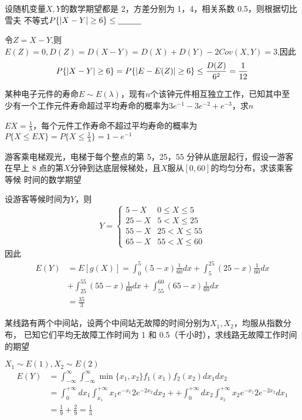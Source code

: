 \documentclass{article}
\begin{document}
\begin{examplle}[]
设随机变量\(X,Y\)的数学期望都是 2，方差分别为 1，4，相关系数 0.5，则根据切比雪夫
不等式\(P\{\abs{X-Y}\ge 6\}\le\und{\hspace{1cm}}\)

令\(Z=X-Y\),则\(E(Z)=0,D(Z)=D(X-Y)=D(X)+D(Y)-2Cov(X,Y)=3\),因此
\begin{equation*}
P\{\abs{X-Y}\ge6\}=P\{\abs{E-E(Z)}\ge6\}\le\frac{D(Z)}{6^2}=\frac{1}{12}
\end{equation*}
\end{examplle}

\begin{examplle}[]
某种电子元件的寿命\(E\sim E(\lambda)\)，现有\(n\)个该钟元件相互独立工作，已知其中至
少有一个工作元件寿命超过平均寿命的概率为\(3e^{-1}-3e^{-2}+e^{-3}\)，求\(n\)

\(EX=\frac{1}{\lambda}\)，每个元件工作寿命不超过平均寿命的概率为
\(P\{X\le EX\}=P\{X\le\frac{1}{\lambda}\}=1-e^{-1}\)
\end{examplle}

\begin{examplle}[]
游客乘电梯观光，电梯于每个整点的第 5，25，55 分钟从底层起行，假设一游客在早上 8
点的第\(X\)分钟到达底层候梯处，且\(X\)服从\([0,60]\)的均匀分布，求该乘客等候
时间的数学期望

设游客等候时间为\(Y\)，则
\begin{equation*}
Y=
\begin{cases}
5-X&0\le X\le 5\\
25-X&5<X\le25\\
55-X&25<X\le 55\\
65-X&55<X\le60
\end{cases}
\end{equation*}
因此
\begin{align*}
E(Y)&=E[g(X)]=\int_0^5(5-x)\frac{1}{60}dx+\int_5^{25}(25-x)\frac{1}{60}dx\\
&+\int_{25}^{55}(55-x)\frac{1}{60}dx+\int_{55}^{60}(65-x)\frac{1}{60}dx\\
&=\frac{35}{3}
\end{align*}
\end{examplle}

\begin{examplle}[]
某线路有两个中间站，设两个中间站无故障的时间分别为\(X_1,X_2\)，均服从指数分布，
已知它们平均无故障工作时间为 1 和 0.5（千小时），求线路无故障工作时间的期望

\(X_1\sim E(1),X_2\sim E(2)\)
\begin{align*}
E(Y)&=\int_{-\infty}^{\infty}\int_{-\infty}^{\infty}\min\{x_1,x_2\}f_1(x_1)f_2(x_2)dx_1dx_2\\
&=\int_0^{+\infty}dx_1\int_{x_1}^{+\infty}x_1e^{-x_1}2e^{-2x_2}dx_2+
+\int_0^{+\infty}dx_2\int_{x_2}^{+\infty}x_2e^{-x_1}2e^{-2x_2}dx_1\\
&=\frac{1}{9}+\frac{2}{9}=\frac{1}{3}
\end{align*}
\end{examplle}
\end{document}
